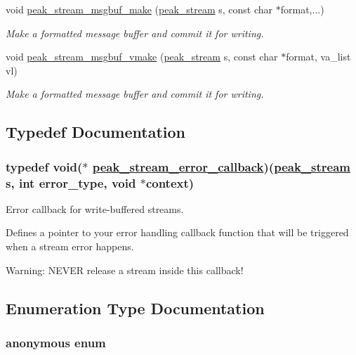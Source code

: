 \begin{CompactItemize}
void \hyperlink{group__stream__buf_ga6}{peak\_\-stream\_\-msgbuf\_\-make} (\hyperlink{group__stream_ga0}{peak\_\-stream} s, const char $\ast$format,...)
\begin{CompactList}\small\item\em Make a formatted message buffer and commit it for writing. \item\end{CompactList}\item 
void \hyperlink{group__stream__buf_ga7}{peak\_\-stream\_\-msgbuf\_\-vmake} (\hyperlink{group__stream_ga0}{peak\_\-stream} s, const char $\ast$format, va\_\-list vl)
\begin{CompactList}\small\item\em Make a formatted message buffer and commit it for writing. \item\end{CompactList}\end{CompactItemize}


\subsection{Typedef Documentation}
\hypertarget{group__stream__buf_ga0}{
\subsubsection[peak\_\-stream\_\-error\_\-callback]{\setlength{\rightskip}{0pt plus 5cm}typedef void($\ast$ \hyperlink{group__stream__buf_ga0}{peak\_\-stream\_\-error\_\-callback})(\hyperlink{group__stream_ga0}{peak\_\-stream} s, int error\_\-type, void $\ast$context)}}
\label{group__stream__buf_ga0}


Error callback for write-buffered streams. 

Defines a pointer to your error handling callback function that will be triggered when a stream error happens.\par
 Warning: NEVER release a stream inside this callback! 

\subsection{Enumeration Type Documentation}
\hypertarget{group__stream__buf_ga8}{
\subsubsection["@6]{\setlength{\rightskip}{0pt plus 5cm}anonymous enum}}
\label{group__stream__buf_ga8}


